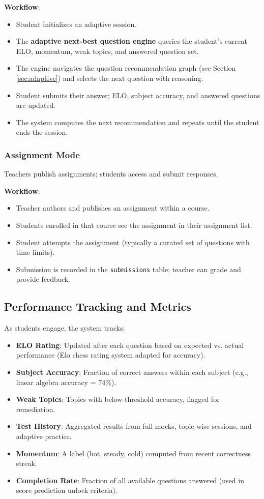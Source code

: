 \documentclass[sigconf,authordraft,twoside]{acmart}
\newcommand{\tech}[1]{\textcolor{brandblue}{\nolinkurl{#1}}}
\begin{document}
\textbf{Workflow}:
\begin{itemize}
\item Student initializes an adaptive session.
\item The \textbf{adaptive next-best question engine} queries the student's current ELO, momentum, weak topics, and answered question set.
\item The engine navigates the question recommendation graph (see Section \ref{sec:adaptive}) and selects the next question with reasoning.
\item Student submits their answer; ELO, subject accuracy, and answered questions are updated.
\item The system computes the next recommendation and repeats until the student ends the session.
\end{itemize}

\subsubsection{Assignment Mode}
Teachers publish assignments; students access and submit responses.

\textbf{Workflow}:
\begin{itemize}
\item Teacher authors and publishes an assignment within a course.
\item Students enrolled in that course see the assignment in their assignment list.
\item Student attempts the assignment (typically a curated set of questions with time limits).
\item Submission is recorded in the \tech{submissions} table; teacher can grade and provide feedback.
\end{itemize}

\subsection{Performance Tracking and Metrics}
As students engage, the system tracks:

\begin{itemize}
\item \textbf{ELO Rating}: Updated after each question based on expected vs. actual performance (Elo chess rating system adapted for accuracy).
\item \textbf{Subject Accuracy}: Fraction of correct answers within each subject (e.g., linear algebra accuracy = 74\%).
\item \textbf{Weak Topics}: Topics with below-threshold accuracy, flagged for remediation.
\item \textbf{Test History}: Aggregated results from full mocks, topic-wise sessions, and adaptive practice.
\item \textbf{Momentum}: A label (hot, steady, cold) computed from recent correctness streak.
\item \textbf{Completion Rate}: Fraction of all available questions answered (used in score prediction unlock criteria).
\end{itemize}
\end{document}
